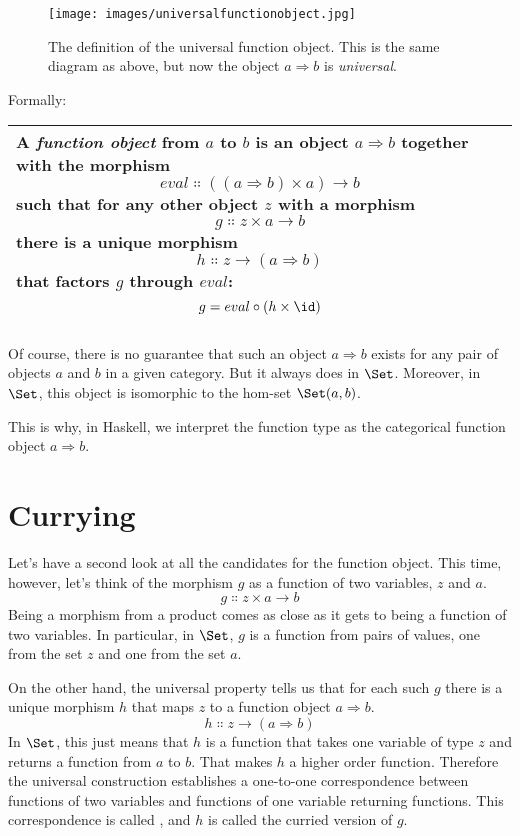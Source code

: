 \begin{figure}[h]
\centering
\texttt{[image: images/universalfunctionobject.jpg]}
\caption{The definition of the universal function object. This is the same
diagram as above, but now the object $a \Rightarrow b$ is \emph{universal}.}
\end{figure}

\noindent
Formally:

\begin{longtable}[]{@{}l@{}}
\toprule
\begin{minipage}[t]{0.97\columnwidth}\raggedright\strut
A \emph{function object} from $a$ to $b$ is an object
$a \Rightarrow b$ together with the morphism
\[eval \Colon ((a \Rightarrow b) \times a) \to b\]
such that for any other object $z$ with a morphism
\[g \Colon z \times a \to b\]
there is a unique morphism
\[h \Colon z \to (a \Rightarrow b)\]
that factors $g$ through $eval$:
\[g = eval \circ (h \times \id)\]
\end{minipage}\tabularnewline
\bottomrule
\end{longtable}

\noindent
Of course, there is no guarantee that such an object $a \Rightarrow b$ exists
for any pair of objects $a$ and $b$ in a given category.
But it always does in $\Set$. Moreover, in $\Set$, this
object is isomorphic to the hom-set $\Set(a, b)$.

This is why, in Haskell, we interpret the function type
 as the categorical function object $a \Rightarrow b$.

\section{Currying}

Let's have a second look at all the candidates for the function object.
This time, however, let's think of the morphism $g$ as a function
of two variables, $z$ and $a$.
\[g \Colon z \times a \to b\]
Being a morphism from a product comes as close as it gets to being a
function of two variables. In particular, in $\Set$, $g$ is
a function from pairs of values, one from the set $z$ and one
from the set $a$.

On the other hand, the universal property tells us that for each such
$g$ there is a unique morphism $h$ that maps $z$ to
a function object $a \Rightarrow b$.
\[h \Colon z \to (a \Rightarrow b)\]
In $\Set$, this just means that $h$ is a function that
takes one variable of type $z$ and returns a function from
$a$ to $b$. That makes $h$ a higher order function.
Therefore the universal construction establishes a one-to-one
correspondence between functions of two variables and functions of one
variable returning functions. This correspondence is called
, and $h$ is called the curried version of $g$.

